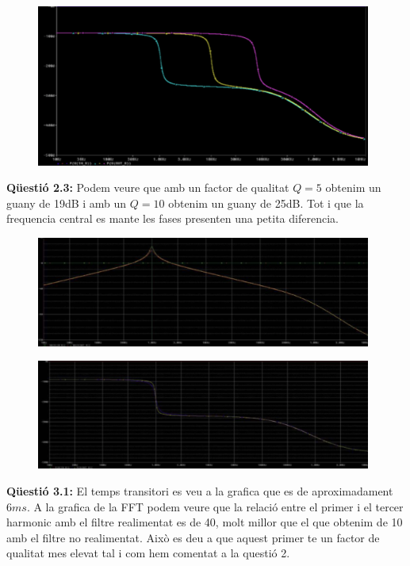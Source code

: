 \documentclass[12pt, a4papre]{article}
\begin{document}
	\begin{figure}[H]
		\begin{center}
		\includegraphics[width=110mm]{2_2_2.png}
		\end{center}
	\end{figure}
	
	\textbf{Qüestió 2.3:} Podem veure que amb un factor de qualitat $Q = 5$ obtenim un guany de 19dB i amb un $Q = 10$ obtenim un guany de 25dB. Tot i que la frequencia central es mante les fases presenten una petita diferencia.
	
	\begin{figure}[H]
		\begin{center}
		\includegraphics[width=110mm]{2_3_1.png}
		\end{center}
	\end{figure}
	
	\begin{figure}[H]
		\begin{center}
		\includegraphics[width=110mm]{2_3_2.png}
		\end{center}
	\end{figure}
	
	\textbf{Qüestió 3.1:} El temps transitori es veu a la grafica que es de aproximadament $6ms$. A la grafica de la FFT podem veure que la relació entre el primer i el tercer harmonic amb el filtre realimentat es de 40, molt millor que el que obtenim de 10 amb el filtre no realimentat. Això es deu a que aquest primer te un factor de qualitat mes elevat tal i com hem comentat a la questió 2.
	
\end{document}
